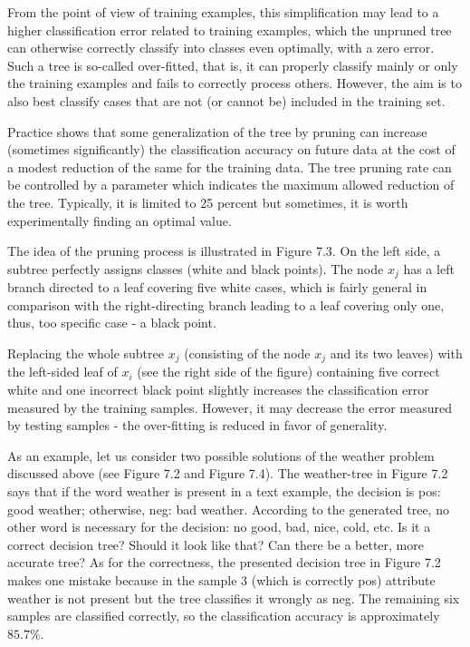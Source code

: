 From the point of view of training examples, this simplification may lead to a higher classification error related to training examples, which the unpruned tree can otherwise correctly classify into classes even optimally, with a zero error. Such a tree is so-called over-fitted, that is, it can properly classify mainly or only
the training examples and fails to correctly process others. However, the aim is to also best classify cases that are not (or cannot be) included in the training set.

Practice shows that some generalization of the tree by pruning can increase (sometimes significantly) the classification accuracy on future data at the cost of a modest reduction of the same for the training data. The tree pruning rate can be controlled by a parameter which indicates the maximum allowed reduction of the tree. Typically, it is limited to 25 percent but sometimes, it is worth experimentally finding an optimal value.

The idea of the pruning process is illustrated in Figure 7.3. On the left side, a subtree perfectly assigns classes (white and black points). The node $x_{j}$ has a left branch directed to a leaf covering five white cases, which is fairly general in comparison with the right-directing branch leading to a leaf covering only one, thus, too specific case - a black point.

Replacing the whole subtree $x_{j}$ (consisting of the node $x_{j}$ and its two leaves) with the left-sided leaf of $x_{i}$ (see the right side of the figure) containing five correct white and one incorrect black point slightly increases the classification error measured by the training samples. However, it may decrease the error measured by testing samples - the over-fitting is reduced in favor of generality.

As an example, let us consider two possible solutions of the weather problem discussed above (see Figure 7.2 and Figure 7.4). The weather-tree in Figure 7.2 says that if the word weather is present in a text example, the decision is pos: good weather; otherwise, neg: bad weather. According to the generated tree, no other word is necessary for the decision: no good, bad, nice, cold, etc. Is it a correct decision tree? Should it look like that? Can there be a better, more accurate tree? As for the correctness, the presented decision tree in Figure 7.2 makes one mistake because in the sample 3 (which is correctly pos) attribute weather is not present but the tree classifies it wrongly as neg. The remaining six samples are classified correctly, so the classification accuracy is approximately $85.7 \%$.

